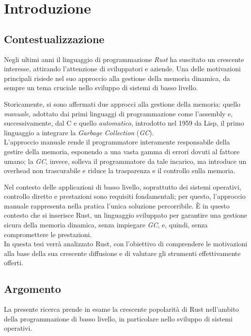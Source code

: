
\chapter{Introduzione}\label{cap:01}
\section{Contestualizzazione}
Negli ultimi anni il linguaggio di programmazione \textit{Rust} ha suscitato 
un crescente interesse, attirando l'attenzione di sviluppatori e aziende.
Una delle motivazioni principali risiede nel suo approccio alla 
gestione della memoria dinamica, da sempre un tema cruciale nello sviluppo di sistemi di basso livello.

Storicamente, si sono affermati due approcci alla gestione della memoria: 
quello \textit{manuale}, adottato dai primi linguaggi di programmazione come 
l'assembly e, successivamente, dal C
e quello \textit{automatico}, introdotto nel 1959 da Lisp, il primo linguaggio 
a integrare la \textit{Garbage Collection} (\textit{GC}). \hfill 
\vspace{8pt}\\
\noindent L'approccio manuale rende il programmatore interamente responsabile 
della gestire della memoria, esponendo a una vasta gamma di errori dovuti al 
fattore umano; la \textit{GC}, invece, solleva il programmatore 
da tale incarico, ma introduce un overhead non trascurabile e riduce 
la trasparenza e il controllo sulla memoria.

Nel contesto delle applicazioni di basso livello, soprattutto dei sistemi 
operativi, controllo diretto e prestazioni sono requisiti fondamentali; 
per questo, l'approccio manuale rappresenta nella pratica l'unica soluzione percorribile.
È in questo contesto che si inserisce Rust, un linguaggio sviluppato per 
garantire una gestione sicura della memoria dinamica, senza impiegare \textit{GC}, e, 
quindi, senza compromettere le prestazioni. \hfill 
\vspace{8pt}\\
\noindent In questa tesi verrà analizzato Rust, con l'obiettivo di comprendere le 
motivazioni alla base della sua crescente diffusione e di valutare gli 
strumenti effettivamente offerti.

\section{Argomento}
La presente ricerca prende in esame la crescente popolarità di Rust nell'ambito
 della programmazione di basso livello, in particolare nello sviluppo di sistemi operativi.

